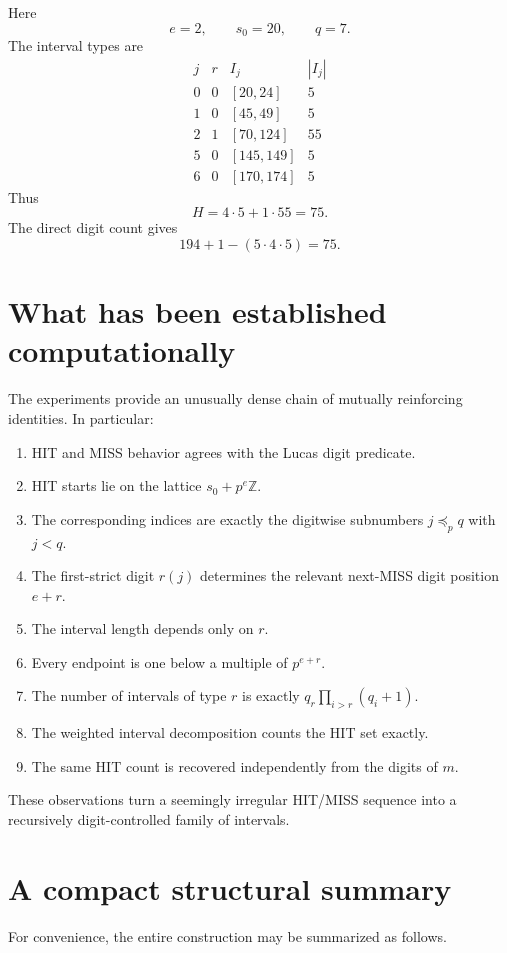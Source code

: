 \documentclass[11pt,a4paper]{article}
\theoremstyle{definition}
\theoremstyle{remark}
\begin{document}
Here
\[
 e=2,
 \qquad
 s_0=20,
 \qquad
 q=7.
\]
The interval types are
\[
\begin{array}{c|c|c|c}
 j&r&I_j&|I_j|\\
\hline
0&0&[20,24]&5\\
1&0&[45,49]&5\\
2&1&[70,124]&55\\
5&0&[145,149]&5\\
6&0&[170,174]&5
\end{array}
\]
Thus
\[
H=4\cdot5+1\cdot55=75.
\]
The direct digit count gives
\[
194+1-(5\cdot4\cdot5)=75.
\]

\section{What has been established computationally}

The experiments provide an unusually dense chain of mutually reinforcing identities.  In particular:
\begin{enumerate}[label=\arabic*.]
  \item HIT and MISS behavior agrees with the Lucas digit predicate.
  \item HIT starts lie on the lattice $s_0+p^e\mathbb{Z}$.
  \item The corresponding indices are exactly the digitwise subnumbers $j\preceq_p q$ with $j<q$.
  \item The first-strict digit $r(j)$ determines the relevant next-MISS digit position $e+r$.
  \item The interval length depends only on $r$.
  \item Every endpoint is one below a multiple of $p^{e+r}$.
  \item The number of intervals of type $r$ is exactly $q_r\prod_{i>r}(q_i+1)$.
  \item The weighted interval decomposition counts the HIT set exactly.
  \item The same HIT count is recovered independently from the digits of $m$.
\end{enumerate}

These observations turn a seemingly irregular HIT/MISS sequence into a recursively digit-controlled family of intervals.

\section{A compact structural summary}

For convenience, the entire construction may be summarized as follows.
\end{document}
